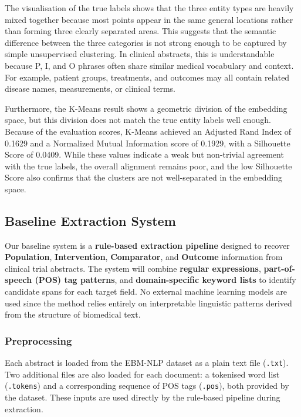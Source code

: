 \documentclass{article}
\begin{document}
The visualisation of the true labels shows that the three entity types are heavily mixed together because most points appear in the same general locations rather than forming three clearly separated areas. This suggests that the semantic difference between the three categories is not strong enough to be captured by simple unsupervised clustering. In clinical abstracts, this is understandable because P, I, and O phrases often share similar medical vocabulary and context. For example, patient groups, treatments, and outcomes may all contain related disease names, measurements, or clinical terms.

Furthermore, the K-Means result shows a geometric division of the embedding space, but this division does not match the true entity labels well enough. Because of the evaluation scores, K-Means achieved an Adjusted Rand Index of 0.1629 and a Normalized Mutual Information score of 0.1929, with a Silhouette Score of 0.0409. While these values indicate a weak but non-trivial agreement with the true labels, the overall alignment remains poor, and the low Silhouette Score also confirms that the clusters are not well-separated in the embedding space.


\subsection{Baseline Extraction System}

Our baseline system is a \textbf{rule-based extraction pipeline} designed to recover \textbf{Population}, \textbf{Intervention}, \textbf{Comparator}, and \textbf{Outcome} information from clinical trial abstracts. The system will combine \textbf{regular expressions}, \textbf{part-of-speech (POS) tag patterns}, and \textbf{domain-specific keyword lists} to identify candidate spans for each target field. No external machine learning models are used since the method relies entirely on interpretable linguistic patterns derived from the structure of biomedical text.

\subsubsection{Preprocessing}

Each abstract is loaded from the EBM-NLP dataset as a plain text file (\texttt{.txt}). Two additional files are also loaded for each document: a tokenised word list (\texttt{.tokens}) and a corresponding sequence of POS tags (\texttt{.pos}), both provided by the dataset. These inputs are used directly by the rule-based pipeline during extraction.
\end{document}
